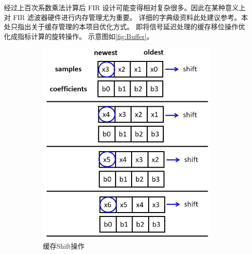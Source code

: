 经过上百次系数乘法计算后 FIR 设计可能变得相对复杂很多。因此在某种意义上对 FIR 滤波器硬件进行内存管理尤为重要。
详细的字典级资料此处建议参考\cite{Parhi2007}。本处只指出关于缓存管理的本项目优化方式。
即将信号延迟处理的缓存移位操作优化成指标计算的旋转操作。
示意图如\ref{fig:Buffer}。
\begin{figure}[ht!]
    \centering
    \begin{subfigure}{0.35\textwidth}
        \includegraphics[width=\textwidth]{figures/Shift.jpg}
        \caption{缓存Shift操作}
        \label{fig:Shift}
    \end{subfigure}
    \hfill
    \begin{subfigure}{0.35\textwidth}

\end{subfigure}
\end{figure}

